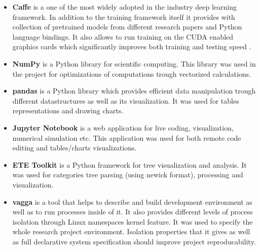\begin{itemize}
    \item \textbf{Caffe} \cite{Jia2014} is a one of the most widely adopted in the industry deep learning framework. In addition to the training framework itself it provides with collection of pretrained models from different research papers \cite{BerkeleyVisionandLearningCenter} and Python language bindings. It also allows to run training on the CUDA \cite{CUDA} enabled graphics cards which significantly improves both training and testing speed \cite{Krizhevsky2012ImageNetDNN}.
    \item \textbf{NumPy} \cite{numpy} is a Python library for scientific computing. This library was used in the project for optimizations of computations trough vectorized calculations.
    \item \textbf{pandas} \cite{pandas} is a Python library which provides efficient data manipulation trough different datastructures as well as its visualization. It was used for tables representations and drawing charts.
    \item \textbf{Jupyter Notebook} \cite{jupyter} is a web application for live coding, visualization, numerical simulation etc. This application was used for both remote code editing and tables/charts visualizations.
    \item \textbf{ETE Toolkit} \cite{ete3} is a Python framework for tree visualization and analysis. It was used for categories tree parsing (using newick \cite{newick} format), processing and visualization.
    \item \textbf{vagga} \cite{vagga} is a tool that helps to describe and build development environment as well as to run processes inside of it. It also provides different levels of process isolation through Linux namespaces \cite{namespaces} kernel feature. It was used to specify the whole research project environment. Isolation properties that it gives as well as full declarative system specification should improve project reproducability.
\end{itemize}
